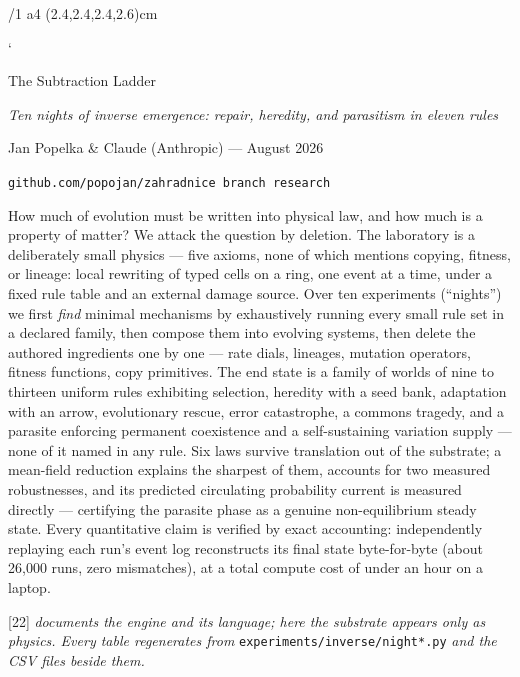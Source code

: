 \fontfam[Equity]
\hyperlinks \Blue \Blue
\report
\margins/1 a4 (2.4,2.4,2.4,2.6)cm
\typosize[11/13.8]
\raggedbottom

\def\repo#1{{\tt #1}}
\def\lawname#1{{\bf #1.}}
\def\g#1{{\tt #1}}
\def\sqr{\sqcup}
\verbchar`

\tit The Subtraction Ladder

\centerline{\it Ten nights of inverse emergence: repair, heredity,
and parasitism in eleven rules}
\medskip
\centerline{Jan Popelka \& Claude (Anthropic) --- August 2026}
\centerline{\tt github.com/popojan/zahradnice \quad branch {\tt research}
\quad \repo{experiments/inverse/}}
\bigskip

How much of evolution must be written into physical law, and how
much is a property of matter? We attack the question by deletion.
The laboratory is a deliberately small physics --- five axioms, none
of which mentions copying, fitness, or lineage: local rewriting of
typed cells on a ring, one event at a time, under a fixed rule
table and an external damage source. Over ten experiments
(“nights”) we first {\it find} minimal mechanisms by exhaustively
running every small rule set in a declared family, then compose
them into evolving systems, then delete the authored ingredients one by one --- rate dials,
lineages, mutation operators, fitness functions, copy primitives.
The end state is a family of worlds of nine to thirteen uniform
rules exhibiting selection, heredity with a seed bank, adaptation
with an arrow, evolutionary rescue, error catastrophe, a commons
tragedy, and a parasite enforcing permanent coexistence and a
self-sustaining variation supply --- none of it named in any
rule. Six laws survive translation out of
the substrate; a mean-field reduction explains the sharpest of
them, accounts for two measured robustnesses, and its predicted
circulating probability current is measured directly ---
certifying the parasite phase as a genuine non-equilibrium steady
state. Every
quantitative claim is verified by exact accounting: independently
replaying each run's event log reconstructs its final state
byte-for-byte (about 26{,}000 runs, zero mismatches), at a total
compute cost of under an hour on a laptop.

\medskip
{} [22] {\it documents the engine and its language; here
the substrate appears only as physics. Every table regenerates
from} \repo{experiments/inverse/night*.py} {\it and the CSV files
beside them.}


